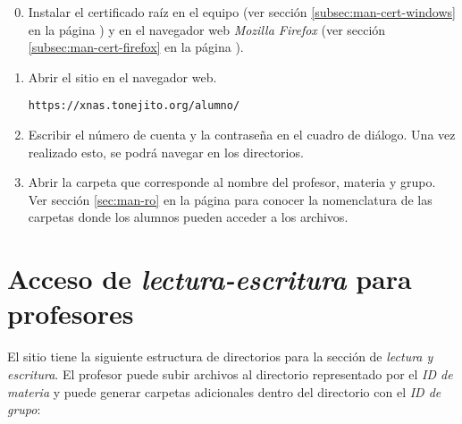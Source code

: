 {
\linespread{1}
\begin{enumerate}
\setcounter{enumi}{-1} %

  \item Instalar el certificado ra\'{i}z en el equipo (ver secci\'{o}n \ref{subsec:man-cert-windows} en la p\'{a}gina \pageref{subsec:man-cert-windows}) y en el navegador web \textsl{Mozilla Firefox} (ver secci\'{o}n \ref{subsec:man-cert-firefox} en la p\'{a}gina \pageref{subsec:man-cert-firefox}).

  \item Abrir el sitio en el navegador web.

    \texttt{https://xnas.tonejito.org/alumno/}


  \item Escribir el n\'{u}mero de cuenta y la contrase\~{n}a en el cuadro de di\'{a}logo. Una vez realizado esto, se podr\'{a} navegar en los directorios.


  \item Abrir la carpeta que corresponde al nombre del profesor, materia y grupo. Ver secci\'{o}n \ref{sec:man-ro} en la p\'{a}gina \pageref{sec:man-ro} para conocer la nomenclatura de las carpetas donde los alumnos pueden acceder a los archivos.

\end{enumerate}
}

\newpage
    \section {Acceso de \textsl{lectura-escritura} para profesores}
    \label{sec:man-rw}


El sitio tiene la siguiente estructura de directorios para la secci\'{o}n de \textit{lectura y escritura}. El profesor puede subir archivos al directorio representado por el \emph{ID de materia} y puede generar carpetas adicionales dentro del directorio con el \emph{ID de grupo}:


